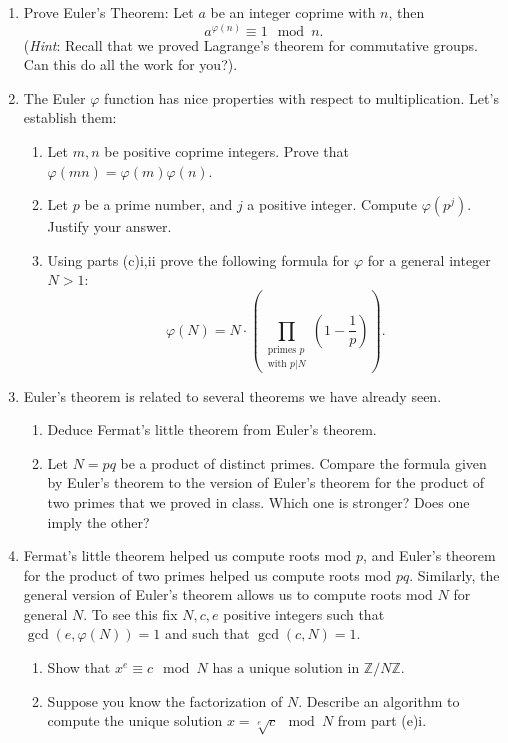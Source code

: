 \documentclass[11pt]{article}
\newcommand{\bZ}{\mathbb{Z}}
\begin{document}
\begin{enumerate}
{\begin{enumerate}
{    Show that $(\bZ/n\bZ)^*$ is a finite commutative group under multiplication.  What is its order?
    }
    \item{
    Prove Euler's Theorem: Let $a$ be an integer coprime with $n$, then
    \[a^{\varphi(n)}\equiv1\mod n.\]
    (\textit{Hint}: Recall that we proved Lagrange's theorem for commutative groups.  Can this do all the work for you?).
    }
    \item{The Euler $\varphi$ function has nice properties with respect to multiplication.  Let's establish them:
    \begin{enumerate}
      \item{
      Let $m,n$ be positive coprime integers.  Prove that $\varphi(mn)=\varphi(m)\varphi(n)$.
      }
      \item{
      Let $p$ be a prime number, and $j$ a positive integer.  Compute $\varphi(p^j)$.  Justify your answer.
      }
      \item{
      Using parts (c)i,ii prove the following formula for $\varphi$ for a general integer $N>1$:
      \[\varphi(N) = N\cdot\left(\prod_{\substack{\text{primes }p\\ \text{with }p|N}}\left(1-\frac{1}{p}\right)\right).\]
      }
    \end{enumerate}
    }
    \item{
    Euler's theorem is related to several theorems we have already seen.
    \begin{enumerate}
      \item{
      Deduce Fermat's little theorem from Euler's theorem.
      }
      \item{
      Let $N=pq$ be a product of distinct primes.  Compare the formula given by Euler's theorem to the version of Euler's theorem for the product of two primes that we proved in class.  Which one is stronger?  Does one imply the other?
      }
    \end{enumerate}
    }
    \item{
    Fermat's little theorem helped us compute roots mod $p$, and Euler's theorem for the product of two primes helped us compute roots mod $pq$.  Similarly, the general version of Euler's theorem allows us to compute roots mod $N$ for general $N$.  To see this fix $N,c,e$ positive integers such that $\gcd(e,\varphi(N)) = 1$ and such that $\gcd(c,N)=1$.
    \begin{enumerate}
      \item{
      Show that $x^e\equiv c\mod N$ has a unique solution in $\bZ/N\bZ$.
      }
      \item{
      Suppose you know the factorization of $N$.  Describe an algorithm to compute the unique solution $x = \sqrt[e]{c}\mod N$ from part (e)i.
      }
    \end{enumerate}
    }
  \end{enumerate}
  }
\end{enumerate}
\end{document}
